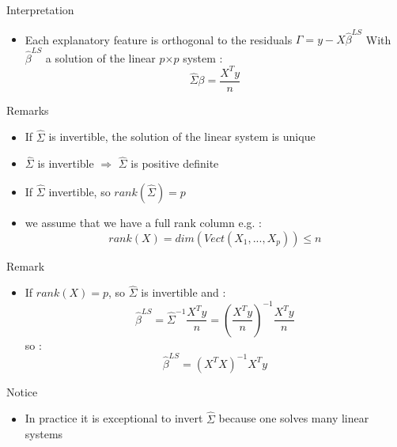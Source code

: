 \documentclass[unknownkeysallowed]{beamer}
\begin{document}
\begin{frame}

\begin{alertblock}{Interpretation}
    \begin{itemize}
        \item  Each explanatory feature is orthogonal to the residuals $\Gamma=y-X\hat{\beta}^{LS}$ With $\hat{\beta}^{LS}$ a solution of the linear $p$$\times$$p$ system : $$ \hat{\Sigma}\beta= \frac{X^T y}{n}  $$

    \end{itemize}


\end{alertblock}

\begin{block}{Remarks}
    \begin{itemize}
        \item  If $\hat{\Sigma}$ is invertible, the solution of the linear system is unique
        \item $\hat{\Sigma}$ is invertible $\Rightarrow$ $\hat{\Sigma}$ is positive definite
        \item If $\hat{\Sigma}$ invertible, so $rank(\hat{\Sigma})=p$
        \item we assume that we have a full rank column e.g. : $$rank(X)=dim(Vect(X_1,...,X_p)) \leq n $$

    \end{itemize}


\end{block}
\end{frame}



\begin{frame}



\begin{alertblock}{Remark}
    \begin{itemize}
        \item  If $rank(X)=p$, so $\hat{\Sigma}$ is invertible and : $$\hat{\beta}^{LS}=\hat{\Sigma}^{-1}\frac{X^T y}{n}=(\frac{X^T y}{n})^{-1} \frac{X^T y}{n}$$
       so :  $$ \hat{\beta}^{LS}=(X^TX)^{-1}X^Ty$$

    \end{itemize}


\end{alertblock}

\begin{block}{Notice}
    \begin{itemize}
        \item  In practice it is exceptional to invert $\hat{\Sigma} $ because one solves many linear systems
       
    \end{itemize}


\end{block}
\end{frame}
\end{document}
